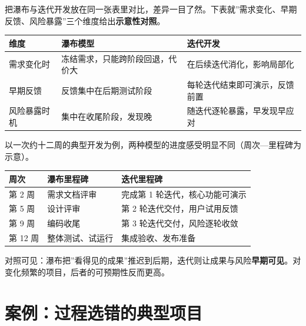 \documentclass[
]{ctexbook}
\newcounter{none}
\begin{document}
把瀑布与迭代开发放在同一张表里对比，差异一目了然。下表就''需求变化、早期反馈、风险暴露''三个维度给出\textbf{示意性对照}。

{\def\LTcaptype{none} %
\begin{longtable}[]{@{}
  >{\raggedright\arraybackslash}p{}
  >{\raggedright\arraybackslash}p{}
  >{\raggedright\arraybackslash}p{}@{}}
\toprule\noalign{}
\begin{minipage}[b]{\linewidth}\raggedright
维度
\end{minipage} & \begin{minipage}[b]{\linewidth}\raggedright
瀑布模型
\end{minipage} & \begin{minipage}[b]{\linewidth}\raggedright
迭代开发
\end{minipage} \\
\midrule\noalign{}
\endhead
\bottomrule\noalign{}
\endlastfoot
需求变化时 & 冻结需求，只能跨阶段回退，代价大 &
在后续迭代消化，影响局部化 \\
早期反馈 & 反馈集中在后期测试阶段 & 每轮迭代结束即可演示，反馈前置 \\
风险暴露时机 & 集中在收尾阶段，发现晚 & 随迭代逐轮暴露，早发现早应对 \\
\end{longtable}
}

以一次约十二周的典型开发为例，两种模型的进度感受明显不同（周次---里程碑为示意）。

{\def\LTcaptype{none} %
\begin{longtable}[]{@{}lll@{}}
\toprule\noalign{}
周次 & 瀑布里程碑 & 迭代里程碑 \\
\midrule\noalign{}
\endhead
\bottomrule\noalign{}
\endlastfoot
第 2 周 & 需求文档评审 & 完成第 1 轮迭代，核心功能可演示 \\
第 5 周 & 设计评审 & 第 2 轮迭代交付，用户试用反馈 \\
第 9 周 & 编码收尾 & 第 3 轮迭代交付，风险逐轮收敛 \\
第 12 周 & 整体测试、试运行 & 集成验收、发布准备 \\
\end{longtable}
}

对照可见：瀑布把''看得见的成果''推迟到后期，迭代则让成果与风险\textbf{早期可见}。对变化频繁的项目，后者的可预期性反而更高。

\section{案例：过程选错的典型项目}\label{ux6848ux4f8bux8fc7ux7a0bux9009ux9519ux7684ux5178ux578bux9879ux76ee}
\end{document}

